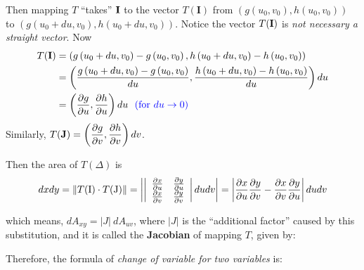 \begin{spacing}{1.3}
    Then mapping $T$ ``takes'' $\bf I$ to the vector $T(\mathbf{I})$ from 
    $\left(g\left(u_{0}, v_{0}\right), h\left(u_{0}, v_{0}\right)\right)$ to 
    $\left(g\left(u_{0}+d u, v_{0}\right), h\left(u_{0}+d u, v_{0}\right)\right)$. 
    Notice the vector $T({\bf I})$ is {\it not necessary a straight vector}. Now
    $$
    \begin{aligned}
    T(\mathbf{I}) &=\left(g\left(u_{0}+d u, v_{0}\right)-g\left(u_{0}, v_{0}\right), h\left(u_{0}+d u, v_{0}\right)-h\left(u_{0}, v_{0}\right)\right) \\
    &=\left(\frac{g\left(u_{0}+d u, v_{0}\right)-g\left(u_{0}, v_{0}\right)}{d u}, \frac{h\left(u_{0}+d u, v_{0}\right)-h\left(u_{0}, v_{0}\right)}{d u}\right) d u \\
    &=\left(\frac{\partial g}{\partial u}, \frac{\partial h}{\partial u}\right) d u 
    \ \ {\rm \color{blue} (for\ } {\color{blue}  du\rightarrow 0)}
    \end{aligned}
    $$
    Similarly, $\displaystyle T(\mathbf{J})=\left(\frac{\partial g}{\partial v}, \frac{\partial h}{\partial v}\right) dv$. 
    
    Then the area of $T(\Delta)$ is
    $$
    d x d y =\left\| T({\rm I})\cdot T({\rm J}) \right\|=\left| \left|\begin{array}{ll}
    \frac{\partial x}{\partial u} & \frac{\partial y}{\partial u} \\
    \frac{\partial x}{\partial v} & \frac{\partial y}{\partial v}
    \end{array}\right| d u d v\right|=\left| \frac{\partial x}{\partial u} \frac{\partial y}{\partial v}-\frac{\partial x}{\partial v} \frac{\partial y}{\partial u} \right| d u d v
    $$

    which means, $dA_{xy}=|J|\ dA_{uv}$, where $|J|$ is the ``additional factor'' caused by this substitution,
    and it is called the {\bf Jacobian} of mapping $T$, given by: 
    \begin{center}
    \end{center}

    Therefore, the formula of {\it change of variable for two variables} is: 
    \begin{center}
    \end{center}
    


\end{spacing}
